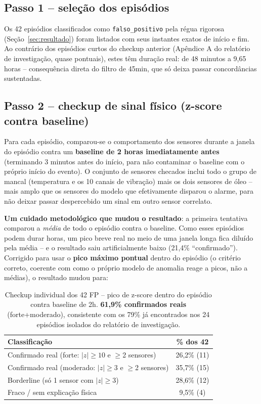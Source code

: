 \documentclass[11pt,a4paper]{article}
\begin{document}
\subsection{Passo 1 -- seleção dos episódios}

Os 42 episódios classificados como \texttt{falso\_positivo} pela
régua rigorosa (Seção~\ref{sec:resultado}) foram listados com seus
instantes exatos de início e fim. Ao contrário dos episódios curtos
do checkup anterior (Apêndice A do relatório de investigação, quase
pontuais), estes têm duração real: de 48 minutos a 9,65 horas --
consequência direta do filtro de 45min, que só deixa passar
concordâncias sustentadas.

\subsection{Passo 2 -- checkup de sinal físico (z-score contra baseline)}

Para cada episódio, comparou-se o comportamento dos sensores durante
a janela do episódio contra um \textbf{baseline de 2 horas
imediatamente antes} (terminando 3 minutos antes do início, para não
contaminar o baseline com o próprio início do evento). O conjunto de
sensores checados inclui todo o grupo de mancal (temperatura e os 10
canais de vibração) mais os dois sensores de óleo -- mais amplo que
os sensores do modelo que efetivamente disparou o alarme, para não
deixar passar despercebido um sinal em outro sensor correlato.

\textbf{Um cuidado metodológico que mudou o resultado}: a primeira
tentativa comparou a \emph{média} de todo o episódio contra o
baseline. Como esses episódios podem durar horas, um pico breve real
no meio de uma janela longa fica diluído pela média -- e o resultado
saiu artificialmente baixo (21,4\% ``confirmado''). Corrigido para
usar o \textbf{pico máximo pontual} dentro do episódio (o critério
correto, coerente com como o próprio modelo de anomalia reage a
picos, não a médias), o resultado mudou para:

\begin{table}[H]
\centering
\begin{tabular}{lc}
\toprule
\textbf{Classificação} & \textbf{\% dos 42} \\
\midrule
Confirmado real (forte: $|z|\geq10$ e $\geq$2 sensores) & 26,2\% (11) \\
Confirmado real (moderado: $|z|\geq3$ e $\geq$2 sensores) & 35,7\% (15) \\
Borderline (só 1 sensor com $|z|\geq3$) & 28,6\% (12) \\
Fraco / sem explicação física & 9,5\% (4) \\
\bottomrule
\end{tabular}
\caption{Checkup individual dos 42 FP -- pico de z-score dentro do
episódio contra baseline de 2h. \textbf{61,9\% confirmados reais}
(forte+moderado), consistente com os 79\% já encontrados nos 24
episódios isolados do relatório de investigação.}
\end{table}
\end{document}
